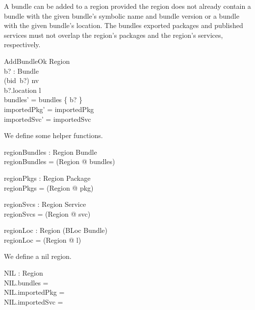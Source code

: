 \documentclass[a4paper,9pt]{article}
\begin{document}
A bundle can be added to a region provided the region does not already contain a bundle with
the given bundle's symbolic name and bundle version or a bundle with the given bundle's location.
The bundles exported packages and published services must not overlap the region's packages
and the region's services, respectively.
\begin{schema}{AddBundleOk}
  \Delta Region \\
  b? : Bundle \\
\where
  (bid~b?) \notin \dom nv \\
  b?.location \notin \dom l \\
  bundles' = bundles \cup \{ b? \} \\
  importedPkg' = importedPkg \\
  importedSvc' = importedSvc \\
\end{schema}

We define some helper functions.
\begin{axdef}
  regionBundles : Region \fun \power Bundle \\
\where
 regionBundles = (\lambda Region @ bundles) \\
\end{axdef}
\begin{axdef}
  regionPkgs : Region \fun \power Package \\
\where
 regionPkgs = (\lambda Region @ pkg) \\
\end{axdef}
\begin{axdef}
  regionSvcs : Region \fun \power Service \\
\where
 regionSvcs = (\lambda Region @ svc) \\
\end{axdef}
\begin{axdef}
  regionLoc : Region \fun (BLoc \pinj Bundle) \\
\where
 regionLoc = (\lambda Region @ l) \\
\end{axdef}

We define a nil region.
\begin{axdef}
  NIL : Region \\
\where
 NIL.bundles = \emptyset \\
 NIL.importedPkg = \emptyset \\
 NIL.importedSvc = \emptyset \\
 \end{axdef}
\end{document}
